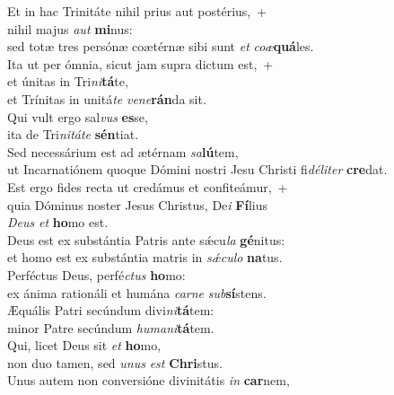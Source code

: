 \evenverse Et in hac Trinitáte nihil prius aut postérius,~+\\
\evenverse  nihil majus \textit{aut} \textbf{mi}nus:~\*\\
\evenverse sed totæ tres persónæ coætérnæ sibi sunt \textit{et} \textit{co}\textit{æ}\textbf{quá}les.\\
\oddverse Ita ut per ómnia, sicut jam supra dictum est,~+\\
\oddverse  et únitas in Tri\textit{ni}\textbf{tá}te,~\*\\
\oddverse et Trínitas in unitá\textit{te} \textit{ve}\textit{ne}\textbf{rán}da sit.\\
\evenverse Qui vult ergo sal\textit{vus} \textbf{es}se,~\*\\
\evenverse ita de Tri\textit{ni}\textit{tá}\textit{te} \textbf{sén}tiat.\\
\oddverse Sed necessárium est ad ætérnam \textit{sa}\textbf{lú}tem,~\*\\
\oddverse ut Incarnatiónem quoque Dómini nostri Jesu Christi fi\textit{dé}\textit{li}\textit{ter} \textbf{cre}dat.\\
\evenverse Est ergo fides recta ut credámus et confiteámur,~+\\
\evenverse  quia Dóminus noster Jesus Christus, De\textit{i} \textbf{Fí}lius~\*\\
\evenverse \textit{De}\textit{us} \textit{et} \textbf{ho}mo est.\\
\oddverse Deus est ex substántia Patris ante sǽcu\textit{la} \textbf{gé}nitus:~\*\\
\oddverse et homo est ex substántia matris in \textit{sǽ}\textit{cu}\textit{lo} \textbf{na}tus.\\
\evenverse Perféctus Deus, perfé\textit{ctus} \textbf{ho}mo:~\*\\
\evenverse ex ánima rationáli et humána \textit{car}\textit{ne} \textit{sub}\textbf{sí}stens.\\
\oddverse Æquális Patri secúndum divi\textit{ni}\textbf{tá}tem:~\*\\
\oddverse minor Patre secúndum \textit{hu}\textit{ma}\textit{ni}\textbf{tá}tem.\\
\evenverse Qui, licet Deus sit \textit{et} \textbf{ho}mo,~\*\\
\evenverse non duo tamen, sed \textit{u}\textit{nus} \textit{est} \textbf{Chri}stus.\\
\oddverse Unus autem non conversióne divinitátis \textit{in} \textbf{car}nem,~\*\\
